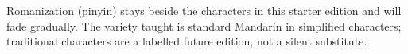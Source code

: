 \documentclass[11pt,twoside]{book}
\begin{document}
Romanization (pinyin) stays beside the characters in this starter edition and
will fade gradually. The variety taught is standard Mandarin in simplified
characters; traditional characters are a labelled future edition, not a silent
substitute.

\tableofcontents

\mainmatter


\end{document}
